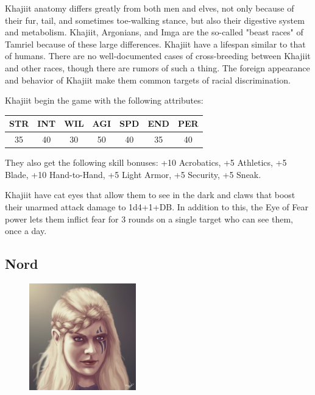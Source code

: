 \documentclass[12pt]{book}
\begin{document}
Khajiit anatomy differs greatly from both men and elves, not only because of their fur, tail, and sometimes toe-walking stance, but also their digestive system and metabolism. Khajiit, Argonians, and Imga are the so-called "beast races" of Tamriel because of these large differences. Khajiit have a lifespan similar to that of humans. There are no well-documented cases of cross-breeding between Khajiit and other races, though there are rumors of such a thing. The foreign appearance and behavior of Khajiit make them common targets of racial discrimination.

Khajiit begin the game with the following attributes:
\begin{center}
\begin{tabular}{|c|c|c|c|c|c|c|}
\hline
STR & INT & WIL & AGI & SPD & END & PER\\ \hline
35 & 40 & 30 & 50 & 40 & 35 & 40\\ \hline
\end{tabular}
\end{center}

They also get the following skill bonuses: +10 Acrobatics, +5 Athletics, +5 Blade, +10 Hand-to-Hand, +5 Light Armor, +5 Security, +5 Sneak.

Khajiit have cat eyes that allow them to see in the dark and claws that boost their unarmed attack damage to 1d4+1+DB. In addition to this, the Eye of Fear power lets them inflict fear for 3 rounds on a single target who can see them, once a day.\\

\subsection{Nord}
\begin{figure}
	\includegraphics[width=\textwidth]{Nord.png}
\end{figure}
\end{document}
